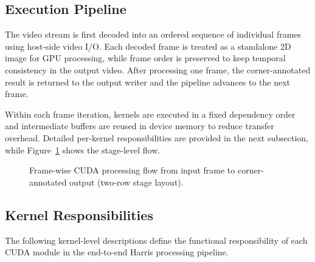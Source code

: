 \documentclass[conference]{IEEEtran}
\begin{document}
\subsection{Execution Pipeline}
The video stream is first decoded into an ordered sequence of individual frames using host-side video I/O. Each decoded frame is treated as a standalone 2D image for GPU processing, while frame order is preserved to keep temporal consistency in the output video. After processing one frame, the corner-annotated result is returned to the output writer and the pipeline advances to the next frame.

Within each frame iteration, kernels are executed in a fixed dependency order and intermediate buffers are reused in device memory to reduce transfer overhead. Detailed per-kernel responsibilities are provided in the next subsection, while Figure~\ref{fig:pipeline} shows the stage-level flow.

\begin{figure}[t]
\centering
{}
\caption{Frame-wise CUDA processing flow from input frame to corner-annotated output (two-row stage layout).}
\label{fig:pipeline}
\end{figure}

\subsection{Kernel Responsibilities}
The following kernel-level descriptions define the functional responsibility of each CUDA module in the end-to-end Harris processing pipeline.
\end{document}

